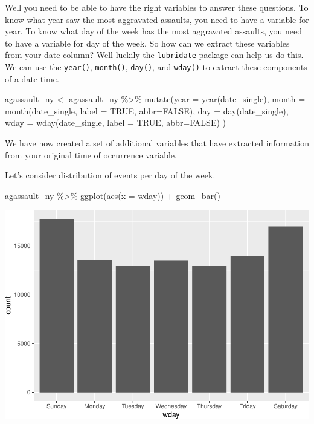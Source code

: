\documentclass[
]{book}
\makeatletter
\newenvironment{Shaded}{\begin{snugshade}}{\end{snugshade}}
\newcommand{\AttributeTok}[1]{\textcolor[rgb]{0.61,0.61,0.61}{#1}}
\newcommand{\ConstantTok}[1]{\textcolor[rgb]{0,0,0}{#1}}
\newcommand{\FunctionTok}[1]{\textcolor[rgb]{0,0,0}{#1}}
\newcommand{\NormalTok}[1]{#1}
\newcommand{\OtherTok}[1]{\textcolor[rgb]{0.37,0.37,0.37}{#1}}
\newcommand{\SpecialCharTok}[1]{\textcolor[rgb]{0,0,0}{#1}}
\newenvironment{kframe}{%
\medskip{}
\setlength{\fboxsep}{.8em}
 \def\at@end@of@kframe{}%
 \ifinner\ifhmode%
  \def\at@end@of@kframe{\end{minipage}}%
  \begin{minipage}{\columnwidth}%
 \fi\fi%
 \def\FrameCommand##1{\hskip\@totalleftmargin \hskip-\fboxsep
 \colorbox{shadecolor}{##1}\hskip-\fboxsep
     \hskip-\linewidth \hskip-\@totalleftmargin \hskip\columnwidth}%
 \MakeFramed {\advance\hsize-\width
   \@totalleftmargin\z@ \linewidth\hsize
   \@setminipage}}%
 {\par\unskip\endMakeFramed%
 \at@end@of@kframe}
\renewenvironment{Shaded}{\begin{kframe}}{\end{kframe}}
\makeatother
\begin{document}
Well you need to be able to have the right variables to answer these questions. To know what year saw the most aggravated assaults, you need to have a variable for year. To know what day of the week has the most aggravated assaults, you need to have a variable for day of the week. So how can we extract these variables from your date column? Well luckily the \texttt{lubridate} package can help us do this. We can use the \texttt{year()}, \texttt{month()}, \texttt{day()}, and \texttt{wday()} to extract these components of a date-time.

\begin{Shaded}
\begin{Highlighting}[]
\NormalTok{agassault\_ny }\OtherTok{\textless{}{-}}\NormalTok{ agassault\_ny }\SpecialCharTok{\%\textgreater{}\%} 
  \FunctionTok{mutate}\NormalTok{(}\AttributeTok{year =} \FunctionTok{year}\NormalTok{(date\_single), }
         \AttributeTok{month =} \FunctionTok{month}\NormalTok{(date\_single, }\AttributeTok{label =} \ConstantTok{TRUE}\NormalTok{, }\AttributeTok{abbr=}\ConstantTok{FALSE}\NormalTok{), }
         \AttributeTok{day =} \FunctionTok{day}\NormalTok{(date\_single), }
         \AttributeTok{wday =} \FunctionTok{wday}\NormalTok{(date\_single, }\AttributeTok{label =} \ConstantTok{TRUE}\NormalTok{, }\AttributeTok{abbr=}\ConstantTok{FALSE}\NormalTok{)}
\NormalTok{         )}
\end{Highlighting}
\end{Shaded}

We have now created a set of additional variables that have extracted information from your original time of occurrence variable.

Let's consider distribution of events per day of the week.

\begin{Shaded}
\begin{Highlighting}[]
\NormalTok{agassault\_ny }\SpecialCharTok{\%\textgreater{}\%} 
  \FunctionTok{ggplot}\NormalTok{(}\FunctionTok{aes}\NormalTok{(}\AttributeTok{x =}\NormalTok{ wday)) }\SpecialCharTok{+}
    \FunctionTok{geom\_bar}\NormalTok{()}
\end{Highlighting}
\end{Shaded}

\includegraphics{crime_mapping_files/figure-latex/assaults_per_wday-1.pdf}
\end{document}
